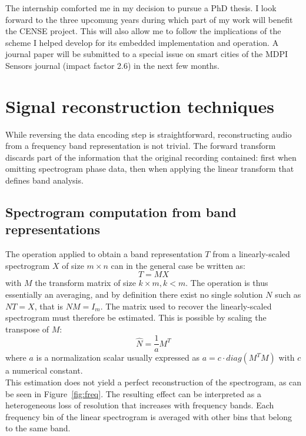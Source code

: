 \documentclass[12pt,times,onecolumn]{article}
\begin{document}
The internship comforted me in my decision to pursue a PhD thesis. I look forward to the three upcomung years during which part of my work will benefit the CENSE project. This will also allow me to follow the implications of the scheme I helped develop for its embedded implementation and operation. A journal paper will be submitted to a special issue on smart cities of the MDPI Sensors journal (impact factor 2.6) in the next few months.

\clearpage
\appendix
\section{Signal reconstruction techniques}
\label{sigrec}
While reversing the data encoding step is straightforward, reconstructing audio from a frequency band representation is not trivial. The forward transform discards part of the information that the original recording contained: first when omitting spectrogram phase data, then when applying the linear transform that defines band analysis.
\subsection{Spectrogram computation from band representations}
The operation applied to obtain a band representation $T$ from a linearly-scaled spectrogram $X$ of size $m\times n$ can in the general case be written as:
\begin{equation}
T = MX
\end{equation}
with $M$ the transform matrix of size $k\times m, k<m$. The operation is thus essentially an averaging, and by definition there exist no single solution $N$ such as $NT = X$, that is $NM = I_m$. The matrix used to recover the linearly-scaled spectrogram must therefore be estimated. This is possible by scaling the transpose of $M$:
\begin{equation}
\hat{N} = \frac{1}{a}M^T
\end{equation}
where $a$ is a normalization scalar usually expressed as $a = c\cdot diag(M^TM)$ with $c$ a numerical constant.\\

This estimation does not yield a perfect reconstruction of the spectrogram, as can be seen in Figure~\ref{fig:freq}. The resulting effect can be interpreted as a heterogeneous loss of resolution that increases with frequency bands. Each frequency bin of the linear spectrogram is averaged with other bins that belong to the same band.
\end{document}
